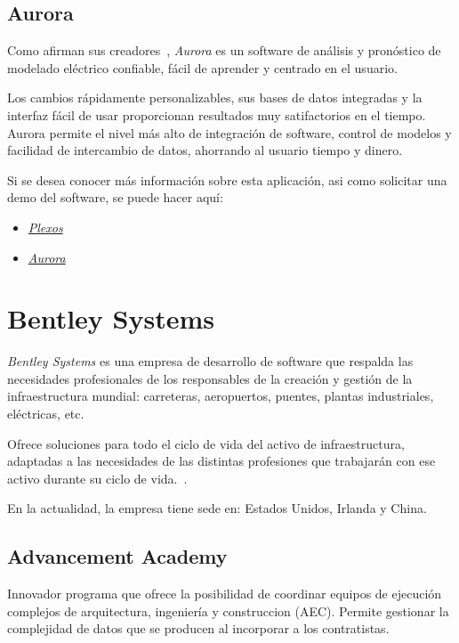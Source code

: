 \subsection{Aurora}

Como afirman sus creadores~\cite{web:EnergyExemplarAurora}, \textit{Aurora} es un software de análisis y pronóstico de modelado eléctrico confiable, fácil de aprender y centrado en el usuario.

Los cambios rápidamente personalizables, sus bases de datos integradas y la interfaz fácil de usar proporcionan resultados muy satifactorios en el tiempo. Aurora permite el nivel más alto de integración de software, control de modelos y facilidad de intercambio de datos, ahorrando al usuario tiempo y dinero.

Si se desea conocer más información sobre esta aplicación, asi como solicitar una demo del software, se puede hacer aquí:

\begin{itemize}
	\item \href{https://energyexemplar.com/products/plexos-simulation-software/}{\textit{Plexos}}
	\item \href{https://energyexemplar.com/products/aurora-electric-modeling-forecasting-software/}{\textit{Aurora}}
\end{itemize}

\section{Bentley Systems}

\textit{Bentley Systems} es una empresa de desarrollo de software que respalda las necesidades profesionales de los responsables de la creación y gestión de la infraestructura mundial: carreteras, aeropuertos, puentes, plantas industriales, eléctricas, etc.

Ofrece soluciones para todo el ciclo de vida del activo de infraestructura, adaptadas a las necesidades de las distintas profesiones que trabajarán con ese activo durante su ciclo de vida.~\cite{bibid}.

En la actualidad, la empresa tiene sede en: Estados Unidos, Irlanda y China.
\subsection{Advancement Academy}

Innovador programa que ofrece la posibilidad de coordinar equipos de ejecución complejos de arquitectura, ingeniería y construccion (AEC). Permite gestionar la complejidad de datos que se producen al incorporar a los contratistas.


